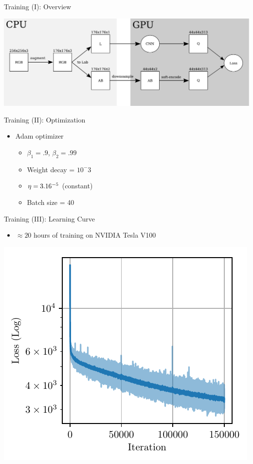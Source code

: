 \documentclass{beamer}
\begin{document}

\begin{frame}{Training (I): Overview}
  \begin{center}
    \includegraphics[width=\textwidth]{resources/training.pdf}
  \end{center}
\end{frame}

\begin{frame}{Training (II): Optimization}
  \begin{itemize}
    \item Adam optimizer
       \begin{itemize}
         \item $\beta_1 = .9$, $\beta_2 = .99$
         \item Weight decay = $10^-3$
         \item $\eta = 3.16 \time 10^{-5}$ (constant)
         \item Batch size = 40
       \end{itemize}
  \end{itemize}
\end{frame}

\begin{frame}{Training (III): Learning Curve}
  \begin{itemize}
    \item $\approx 20$ hours of training on NVIDIA Tesla V100
  \end{itemize}

  \begin{center}
    \includegraphics[width=.6\textwidth]{resources/learning_curve.pdf}
  \end{center}
\end{frame}
\end{document}

